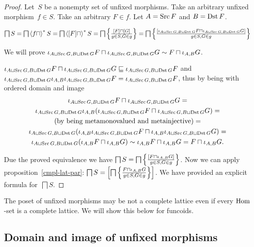 \begin{proof}
Let~$S$ be a nonempty set of unfixed morphisms. Take
an arbitrary unfixed morphism~$f\in S$. Take an
arbitrary $F\in f$. Let $A=\operatorname{Src} F$ and $B=\operatorname{Dst} F$.

$\bigsqcap S=\bigsqcap\left\langle f\sqcap\right\rangle ^{\ast}S=
\bigsqcap\left\langle [F]\sqcap\right\rangle ^{\ast}S=
\bigsqcap\left\{ \frac{[F]\sqcap[G]}{g\in S,G\in g}\right\}=
\bigsqcap\left\{ \frac{[\iota_{A\sqcup\operatorname{Src} G,B\sqcup\operatorname{Dst} G}F\sqcap\iota_{A\sqcup\operatorname{Src} G,B\sqcup\operatorname{Dst} G}G]}{g\in S,G\in g}\right\}$

We will prove
$\iota_{A\sqcup\operatorname{Src} G,B\sqcup\operatorname{Dst} G}F\sqcap\iota_{A\sqcup\operatorname{Src} G,B\sqcup\operatorname{Dst} G}G \sim F\sqcap\iota_{A,B}G$.

$\iota_{A\sqcup\operatorname{Src} G,B\sqcup\operatorname{Dst} G}F\sqcap\iota_{A\sqcup\operatorname{Src} G,B\sqcup\operatorname{Dst} G}G\sqsubseteq
\iota_{A\sqcup\operatorname{Src} G,B\sqcup\operatorname{Dst} G}F$ and
$\iota_{A\sqcup\operatorname{Src} G,B\sqcup\operatorname{Dst} G}\iota_{A,B}\iota_{A\sqcup\operatorname{Src} G,B\sqcup\operatorname{Dst} G}F=
\iota_{A\sqcup\operatorname{Src} G,B\sqcup\operatorname{Dst} G}F$, thus by
being with ordered domain and image
\begin{multline*}
\iota_{A\sqcup\operatorname{Src} G,B\sqcup\operatorname{Dst} G}F\sqcap\iota_{A\sqcup\operatorname{Src} G,B\sqcup\operatorname{Dst} G}G = \\
\iota_{A\sqcup\operatorname{Src} G,B\sqcup\operatorname{Dst} G}\iota_{A,B}(\iota_{A\sqcup\operatorname{Src} G,B\sqcup\operatorname{Dst} G}F\sqcap\iota_{A\sqcup\operatorname{Src} G,B\sqcup\operatorname{Dst} G}G) = \\
\text{(by being metamonovalued and metainjective)} = \\
\iota_{A\sqcup\operatorname{Src} G,B\sqcup\operatorname{Dst} G}(
\iota_{A,B}\iota_{A\sqcup\operatorname{Src} G,B\sqcup\operatorname{Dst} G}F\sqcap
\iota_{A,B}\iota_{A\sqcup\operatorname{Src} G,B\sqcup\operatorname{Dst} G}G) = \\
\iota_{A\sqcup\operatorname{Src} G,B\sqcup\operatorname{Dst} G}(
\iota_{A,B}F\sqcap\iota_{A,B}G) \sim
\iota_{A,B}F\sqcap\iota_{A,B}G=
F\sqcap\iota_{A,B}G.
\end{multline*}

Due the proved equivalence we have
$\bigsqcap S=
\bigsqcap\left\{ \frac{[F\sqcap\iota_{A,B}G]}{g\in S,G\in g}\right\}$.
Now we can apply proposition~\ref{cmpl-lat-par}:
$\bigsqcap S=
\left[\bigsqcap\left\{ \frac{F\sqcap\iota_{A,B}G}{g\in S,G\in g}\right\}\right]$. We have provided an explicit formula
for~$\bigsqcap S$.
\end{proof}

The poset of unfixed morphisms may be not a complete
lattice even if every $\operatorname{Hom}$-set is a complete lattice.
We will show this below for funcoids.

\subsection{Domain and image of unfixed morphisms}

